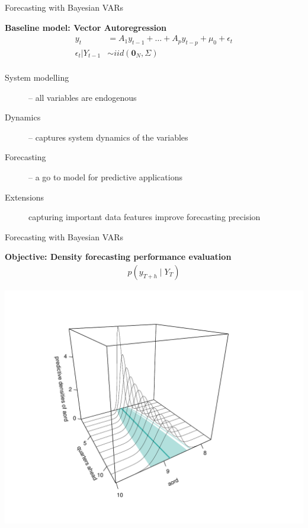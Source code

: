 \documentclass[notes,blackandwhite,mathsans]{beamer}
\begin{document}
\begin{frame}{Forecasting with Bayesian VARs}

\textbf{Baseline model: Vector Autoregression}
\begin{align*}
y_t &= A_1 y_{t-1} + \dots + A_p y_{t-p}  + \mu_0 + \epsilon_t\\[1ex]
\epsilon_t|Y_{t-1} &\sim iid\left(\mathbf{0}_N,\Sigma\right)\\
\end{align*}

\begin{description}
\item[System modelling] {\color{mcxs2}-- all variables are endogenous} 
\item[Dynamics] {\color{mcxs2}-- captures system dynamics of the variables} 
\item[Forecasting] {\color{mcxs2}-- a go to model for predictive applications} 
\item[Extensions] {\color{mcxs2} capturing important data features improve forecasting precision}
\end{description}
\end{frame}




\begin{frame}{Forecasting with Bayesian VARs}

\bigskip\textbf{Objective: Density forecasting performance evaluation}
\begin{align*}
p(y_{T+h}\mid Y_{T})
\end{align*}

\centering
\includegraphics[scale=0.4, trim=0cm 0cm 0cm 1cm]{grphs/06density}

\end{frame}
\end{document}
